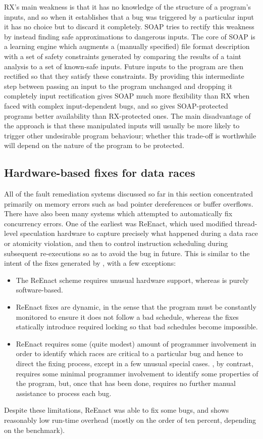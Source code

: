 RX's main weakness is that it has no knowledge of the structure of a
program's inputs, and so when it establishes that a bug was triggered
by a particular input it has no choice but to discard it completely.
SOAP\cite{Long2012} tries to rectify this weakness by instead finding
safe approximations to dangerous inputs.  The core of SOAP is a
learning engine which augments a (manually specified) file format
description with a set of safety constraints generated by comparing
the results of a taint analysis to a set of known-safe inputs.  Future
inputs to the program are then rectified so that they satisfy these
constraints.  By providing this intermediate step between passing an
input to the program unchanged and dropping it completely input
rectification gives SOAP much more flexibility than RX when faced with
complex input-dependent bugs, and so gives SOAP-protected programs
better availability than RX-protected ones.  The main disadvantage of
the approach is that these manipulated inputs will usually be more
likely to trigger other undesirable program behaviour; whether this
trade-off is worthwhile will depend on the nature of the program to be
protected.

\subsection{Hardware-based fixes for data races}
All of the fault remediation systems discussed so far in this section
concentrated primarily on memory errors such as bad pointer
dereferences or buffer overflows.  There have also been many systems
which attempted to automatically fix concurrency errors.  One of the
earliest was ReEnact\cite{Prvulovic2003a}, which used modified
thread-level speculation hardware to capture precisely what happened
during a data race or atomicity violation, and then to control
instruction scheduling during subsequent re-executions so as to avoid
the bug in future.  This is similar to the intent of the fixes
generated by {\technique}, with a few exceptions:
\begin{itemize}
\item The ReEnact scheme requires unusual hardware support, whereas
  {\technique} is purely software-based.
\item ReEnact fixes are dynamic, in the sense that the program must be
  constantly monitored to ensure it does not follow a bad schedule,
  whereas the {\technique} fixes statically introduce required locking
  so that bad schedules become impossible.
\item ReEnact requires some (quite modest) amount of programmer
  involvement in order to identify which races are critical to a
  particular bug and hence to direct the fixing process, except in a
  few unusual special cases.  {\Technique}, by contrast, requires some
  minimal programmer involvement to identify some properties of the
  program, but, once that has been done, requires no further manual
  assistance to process each bug.
\end{itemize}
Despite these limitations, ReEnact was able to fix some bugs, and
shows reasonably low run-time overhead (mostly on the order of ten
percent, depending on the benchmark).

